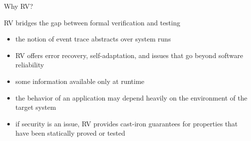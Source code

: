 \documentclass[10pt,usenames,dvipsnames]{beamer}
\begin{document}

\begin{frame}{Why RV?}
  \begin{block}{RV bridges the gap between formal verification and testing}
    \begin{itemize}
    \item the notion of event trace abstracts over system runs
    \item RV offers error recovery, self-adaptation, and issues that go beyond software reliability
    \item some information available only at runtime
    \item the behavior of an application may depend heavily on the environment of the target system
    \item if security is an issue, RV provides cast-iron guarantees for properties that have been statically proved or tested
    \end{itemize}
  \end{block}
\end{frame}


\end{document}
